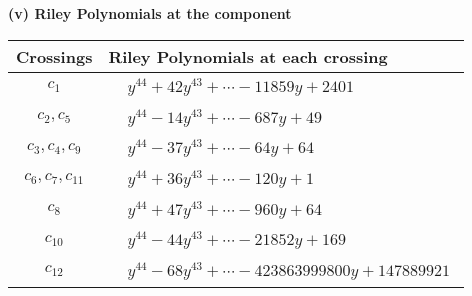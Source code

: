 \documentclass[1p]{elsarticle_modified}
\theoremstyle{definition}
\begin{document}
\newpage\renewcommand{\arraystretch}{1}
\flushleft \textbf{(v) Riley Polynomials at the component}\newline \\
\begin{tabular}{m{50pt}|m{274pt}}
Crossings & \hspace{64pt}Riley Polynomials at each crossing \\
\hline $$\begin{aligned}c_{1}\end{aligned}$$&$\begin{aligned}
&y^{44}+42 y^{43}+\cdots-11859 y+2401
\end{aligned}$\\
\hline $$\begin{aligned}c_{2},c_{5}\end{aligned}$$&$\begin{aligned}
&y^{44}-14 y^{43}+\cdots-687 y+49
\end{aligned}$\\
\hline $$\begin{aligned}c_{3},c_{4},c_{9}\end{aligned}$$&$\begin{aligned}
&y^{44}-37 y^{43}+\cdots-64 y+64
\end{aligned}$\\
\hline $$\begin{aligned}c_{6},c_{7},c_{11}\end{aligned}$$&$\begin{aligned}
&y^{44}+36 y^{43}+\cdots-120 y+1
\end{aligned}$\\
\hline $$\begin{aligned}c_{8}\end{aligned}$$&$\begin{aligned}
&y^{44}+47 y^{43}+\cdots-960 y+64
\end{aligned}$\\
\hline $$\begin{aligned}c_{10}\end{aligned}$$&$\begin{aligned}
&y^{44}-44 y^{43}+\cdots-21852 y+169
\end{aligned}$\\
\hline $$\begin{aligned}c_{12}\end{aligned}$$&$\begin{aligned}
&y^{44}-68 y^{43}+\cdots-423863999800 y+147889921
\end{aligned}$\\
\hline
\end{tabular}\\~\\
\end{document}
